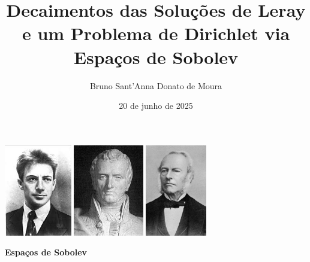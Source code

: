 \documentclass[xcolor=dvipsnames, aspectratio=169, 10pt]{beamer}
\title{Decaimentos das Soluções de Leray e um Problema de
Dirichlet via Espaços de Sobolev}
\author{Bruno Sant'Anna Donato de Moura}
\date{20 de junho de 2025}
\institute{Universidade Federal de Sergipe\\Departamento de Matemática}
\begin{document}
\maketitle

\begin{frame}
    \begin{center}
        \includegraphics[height=4cm]{../sobolev.jpg} \hspace{5mm} \includegraphics[height=4cm]{../Claude-Louis_Navier.jpg} \hspace{5mm} \includegraphics[height=4cm]{../SS-stokes.jpg}
    \end{center}
\end{frame}
\begin{frame}
    \begin{center}
        \bfseries\huge Espaços de Sobolev
    \end{center}
\end{frame}
\end{document}
